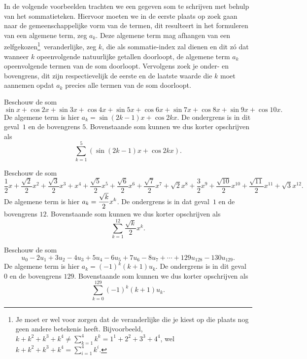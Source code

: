 \documentclass{ximera}
\begin{document}
In de volgende voorbeelden trachten we een gegeven som te
schrijven met behulp van het sommatieteken. Hiervoor moeten we in
de eerste plaats op zoek gaan naar de gemeenschappelijke vorm van
de termen, dit resulteert in het formuleren van een algemene term,
zeg $a_k$. Deze algemene term mag afhangen van een
zelfgekozen\footnote{Je moet er wel voor zorgen dat de
veranderlijke die je kiest op die plaats nog geen andere betekenis
heeft. Bijvoorbeeld,
$k+k^2+k^3+k^4\neq\sum\limits_{k=1}^4k^k=1^1+2^2+3^3+4^4$, wel
$k+k^2+k^3+k^4=\sum\limits_{i=1}^4k^i$.}\ veranderlijke, zeg $k$,
die als sommatie-index zal dienen en dit z\'o dat wanneer $k$
opeenvolgende natuurlijke getallen doorloopt, de algemene term
$a_k$ opeenvolgende termen van de som doorloopt. Vervolgens zoek
je onder- en bovengrens, dit zijn respectievelijk de eerste en de
laatste waarde die $k$ moet aannemen opdat $a_k$ precies alle
termen van de som doorloopt.
\begin{example}
Beschouw de som\[\sin x+\cos 2x+\sin 3x+\cos 4x+\sin 5x+\cos
6x+\sin 7x+\cos 8x+\sin 9x+\cos 10x.\] De algemene term is hier
$a_k=\sin(2k-1)x+\cos2kx$. De ondergrens is in dit geval~$1$ en de
bovengrens $5$. Bovenstaande som kunnen we dus korter opschrijven
als\[\sum_{k=1}^5\left(\sin(2k-1)x+\cos2kx\right).\]
\end{example}
\begin{example}
Beschouw de
som\[\frac{1}{2}x+\frac{\sqrt{2}}{2}x^2+\frac{\sqrt{3}}{2}x^3+x^4+\frac{\sqrt{5}}{2}x^5+\frac{\sqrt{6}}{2}x^6+\frac{\sqrt{7}}{2}x^7+\sqrt{2}x^8+\frac{3}{2}x^9+\frac{\sqrt{10}}{2}x^{10}+\frac{\sqrt{11}}{2}x^{11}+\sqrt{3}x^{12}.\]
De algemene term is hier $\displaystyle{a_k=\frac{\sqrt{k}}{2}x^k}$. De
ondergrens is in dat geval~$1$ en de bovengrens $12$. Bovenstaande
som kunnen we dus korter opschrijven
als\[\sum_{k=1}^{12}\frac{\sqrt{k}}{2}x^k.\]
\end{example}
\begin{example}
Beschouw de
som\[u_0-2u_1+3u_2-4u_3+5u_4-6u_5+7u_6-8u_7+\cdots+129u_{128}-130u_{129}.\]
De algemene term is hier $a_k=(-1)^k(k+1)u_k$. De ondergrens is in
dit geval~$0$ en de bovengrens $129$. Bovenstaande som kunnen we
dus korter opschrijven als\[\sum_{k=0}^{129}(-1)^k(k+1)u_k.\]
\end{example}
\end{document}

